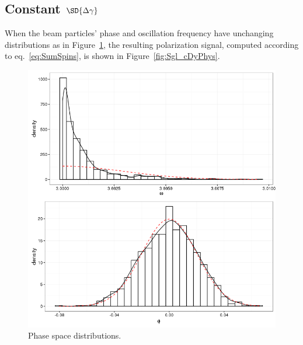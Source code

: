 \documentclass{article}
\begin{document}
\subsection{Constant $\SD{\dy}$}
When the beam particles' phase and oscillation frequency have unchanging distributions as in Figure~\ref{fig:PSdist_cDy}, the resulting polarization signal, computed according to eq.~\eqref{eq:SumSpins}, is shown in Figure~\ref{fig:Sgl_cDyPhys}.
\begin{figure}[h]
	\centering
	\includegraphics[scale=.5]{../img/PS_dist}
	\caption{Phase space distributions.\label{fig:PSdist_cDy}}
\end{figure}
\end{document}
